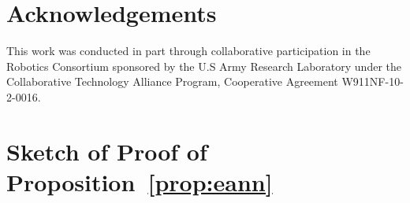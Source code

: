 \section*{Acknowledgements} 
This work was conducted in part through collaborative participation in the Robotics Consortium sponsored by the U.S Army Research Laboratory under the Collaborative Technology Alliance Program, Cooperative Agreement W911NF-10-2-0016. 



{

}

\appendix




\section{Sketch of Proof of Proposition~\ref{prop:eann}}
